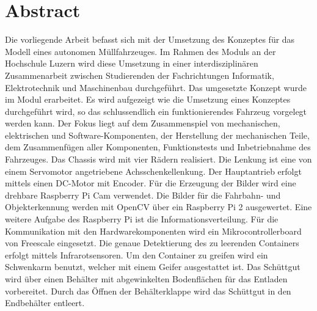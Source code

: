 \section*{Abstract}
Die vorliegende Arbeit befasst sich mit der Umsetzung des Konzeptes für das Modell eines autonomen Müllfahrzeuges. Im Rahmen des Moduls \grqq an der Hochschule Luzern wird diese Umsetzung in einer interdisziplinären Zusammenarbeit zwischen Studierenden der Fachrichtungen Informatik, Elektrotechnik und Maschinenbau durchgeführt. Das umgesetzte Konzept wurde im Modul \grqq erarbeitet. Es wird aufgezeigt wie die Umsetzung eines Konzeptes durchgeführt wird, so das schlussendlich ein funktionierendes Fahrzeug vorgelegt werden kann. Der Fokus liegt auf dem Zusammenspiel von mechanischen, elektrischen und Software-Komponenten, der Herstellung der mechanischen Teile, dem Zusammenfügen aller Komponenten, Funktionstests und Inbetriebnahme des Fahrzeuges. Das Chassis wird mit vier Rädern realisiert. Die Lenkung ist eine von einem Servomotor angetriebene Achsschenkellenkung. Der Hauptantrieb erfolgt mittels einen DC-Motor mit Encoder. Für die Erzeugung der Bilder wird eine drehbare Raspberry Pi Cam verwendet. Die Bilder für die Fahrbahn- und Objekterkennung werden mit OpenCV über ein Raspberry Pi 2 ausgewertet. Eine weitere Aufgabe des Raspberry Pi ist die Informationsverteilung. Für die Kommunikation mit den Hardwarekomponenten wird ein Mikrocontrollerboard von Freescale eingesetzt. Die genaue Detektierung des zu leerenden Containers erfolgt mittels Infrarotsensoren. Um den Container zu greifen wird ein Schwenkarm benutzt, welcher mit einem Geifer ausgestattet ist. Das Schüttgut wird über einen Behälter mit abgewinkelten Bodenflächen für das Entladen vorbereitet. Durch das Öffnen der Behälterklappe wird das Schüttgut in den Endbehälter entleert.
\clearpage
